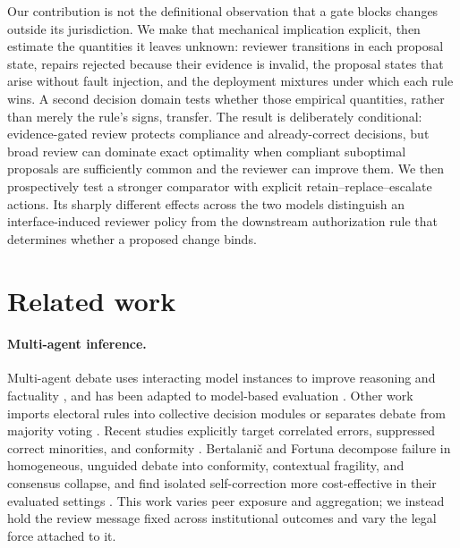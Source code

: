 \documentclass[10pt]{article}
\begin{document}
Our contribution is not the definitional observation that a gate blocks changes
outside its jurisdiction. We make that mechanical implication explicit, then
estimate the quantities it leaves unknown: reviewer transitions in each proposal
state, repairs rejected because their evidence is invalid, the proposal states
that arise without fault injection, and the deployment mixtures under which each
rule wins. A second decision domain tests whether those empirical quantities,
rather than merely the rule's signs, transfer. The result is deliberately
conditional: evidence-gated review protects compliance and already-correct
decisions, but broad review can dominate exact optimality when compliant
suboptimal proposals are sufficiently common and the reviewer can improve them.
We then prospectively test a stronger comparator with explicit
retain--replace--escalate actions. Its sharply different effects across the two
models distinguish an interface-induced reviewer policy from the downstream
authorization rule that determines whether a proposed change binds.

\section{Related work}

\paragraph{Multi-agent inference.}
Multi-agent debate uses interacting model instances to improve reasoning and
factuality \cite{du2023debate}, and has been adapted to model-based evaluation
\cite{chan2023chateval}. Other work imports electoral rules into collective
decision modules \cite{zhao2024electoral} or separates debate from majority
voting \cite{choi2025debatevote}. Recent studies explicitly target correlated
errors, suppressed correct minorities, and conformity
\cite{he2026minority,wu2026dear}. Bertalani\v{c} and Fortuna decompose failure
in homogeneous, unguided debate into conformity, contextual fragility, and
consensus collapse, and find isolated self-correction more cost-effective in
their evaluated settings \cite{bertalanic2026consensus}. This work varies peer
exposure and aggregation; we instead hold the review message fixed across
institutional outcomes and vary the legal force attached to it.
\end{document}
